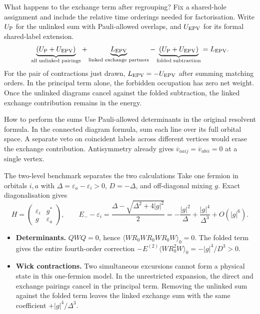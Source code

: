 \documentclass[aspectratio=169,10pt]{beamer}
\newcommand{\av}[1]{\langle #1\rangle_0}
\newcommand{\vbar}[4]{\overline v_{#1#2#3#4}}
\begin{document}
\begin{frame}{What happens to the exchange term after regrouping?}
Fix a shared-hole assignment and include the relative time orderings needed for factorisation. Write $U_{\rm P}$ for the unlinked sum with Pauli-allowed overlaps, and $U_{\rm EPV}$ for its formal shared-label extension.
\[
 \underbrace{(U_{\rm P}+U_{\rm EPV})}_{\text{all unlinked pairings}}
 +\underbrace{L_{\rm EPV}}_{\text{linked exchange partners}}
 -\underbrace{(U_{\rm P}+U_{\rm EPV})}_{\text{folded subtraction}}
 =L_{\rm EPV}.
\]
For the pair of contractions just drawn, $L_{\rm EPV}=-U_{\rm EPV}$ after summing matching orders. In the principal term alone, the forbidden occupation has zero net weight. Once the unlinked diagrams cancel against the folded subtraction, the linked exchange contribution remains in the energy.
\begin{block}{How to perform the sums}
Use Pauli-allowed determinants in the original resolvent formula. In the connected diagram formula, sum each line over its full orbital space. A separate veto on coincident labels across different vertices would erase the exchange contribution. Antisymmetry already gives $\vbar{a}{a}{i}{j}=\vbar{a}{b}{i}{i}=0$ at a single vertex.
\end{block}
\end{frame}

\begin{frame}{The two-level benchmark separates the two calculations}
Take one fermion in orbitals $i,a$ with $\Delta=\varepsilon_a-\varepsilon_i>0$, $D=-\Delta$, and off-diagonal mixing $g$. Exact diagonalisation gives
\[
 H=\begin{pmatrix}\varepsilon_i&g^*\\g&\varepsilon_a\end{pmatrix},
 \qquad E_- -\varepsilon_i=
 \frac{\Delta-\sqrt{\Delta^2+4|g|^2}}2
 =-\frac{|g|^2}{\Delta}+\frac{|g|^4}{\Delta^3}+O(|g|^6).
\]
\begin{itemize}
\item \textbf{Determinants.} $QWQ=0$, hence $\av{WR_0WR_0WR_0W}=0$. The folded term gives the entire fourth-order correction
$-E^{(2)}\av{WR_0^2W}=-|g|^4/D^3>0$.
\item \textbf{Wick contractions.} Two simultaneous excursions cannot form a physical state in this one-fermion model. In the unrestricted expansion, the direct and exchange pairings cancel in the principal term. Removing the unlinked sum against the folded term leaves the linked exchange sum with the same coefficient $+|g|^4/\Delta^3$.
\end{itemize}
\end{frame}
\end{document}
